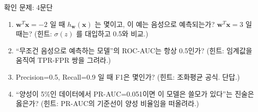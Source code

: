\begin{frame}{확인 문제: 4문단}
  \begin{enumerate}
    \item $\boldsymbol{w}^T\boldsymbol{x} = -2$ 일 때 $h_{\boldsymbol{w}}(\boldsymbol{x})$ 는 몇이고, 이 예는 음성으로
      예측되는가? $\boldsymbol{w}^T\boldsymbol{x} = 3$ 일 때는?
      (힌트: $\sigma(z)$ 를 대입하고 0.5와 비교.)
    \item ``무조건 음성으로 예측하는 모델''의 ROC-AUC는 항상 0.5인가?
      (힌트: 임계값을 움직여 TPR-FPR 쌍을 그려라.)
    \item Precision=0.5, Recall=0.9 일 때 F1은 몇인가?
      (힌트: 조화평균 공식. 단답.)
    \item ``양성이 5\%인 데이터에서 PR-AUC=0.051이면 이 모델은
      쓸모가 있다''는 진술은 옳은가? (힌트: PR-AUC의 기준선이
      양성 비율임을 떠올려라.)
  \end{enumerate}
\end{frame}
